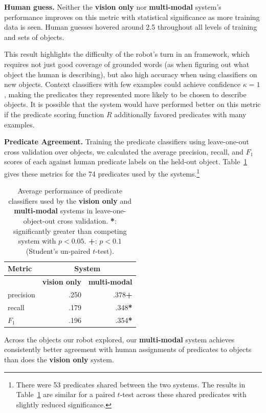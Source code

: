 \textbf{Human guess.} Neither the \textbf{vision only} nor \textbf{multi-modal} system's performance improves on this metric with statistical significance as more training data is seen.
Human guesses hovered around 2.5 throughout all levels of training and sets of objects.

This result highlights the difficulty of the robot's turn in an \ispy framework, which requires not just good coverage of grounded words (as when figuring out what object the human is describing), but also high accuracy when using classifiers on new objects.
Context classifiers with few examples could achieve confidence $\kappa=1$, making the predicates they represented more likely to be chosen to describe objects.
It is possible that the system would have performed better on this metric if the predicate scoring function $R$ additionally favored predicates with many examples.

\textbf{Predicate Agreement.} Training the predicate classifiers using leave-one-out cross validation over objects, we calculated the average precision, recall, and $F_1$ scores of each against human predicate labels on the held-out object.
Table~\ref{tab:predicate_results} gives these metrics for the 74 predicates used by the systems.\footnote{There were 53 predicates shared between the two systems.
The results in Table~\ref{tab:predicate_results} are similar for a paired $t$-test across these shared predicates with slightly reduced significance.}

\begin{table}
\centering
\begin{tabular}[h]{|l|r|r|}
	\hline
	\bf Metric & \multicolumn{2}{c|}{\bf System} \\ \hline \hline
	& \bf vision only & \bf multi-modal \\ \hline
	precision & .250 & .378\textbf{+} \\
	recall & .179 & .348\textbf{*} \\
	\bf $F_1$ & .196 & .354\textbf{*} \\ \hline
\end{tabular}
\caption{Average performance of predicate classifiers used by the \textbf{vision only} and \textbf{multi-modal} systems in leave-one-object-out cross validation.
\textbf{*}: significantly greater than competing system with $p<0.05$.
\textbf{+}: $p<0.1$ (Student's un-paired $t$-test).}
\label{tab:predicate_results}
\end{table}

Across the objects our robot explored, our \textbf{multi-modal} system achieves consistently better agreement with human assignments of predicates to objects than does the \textbf{vision only} system.
